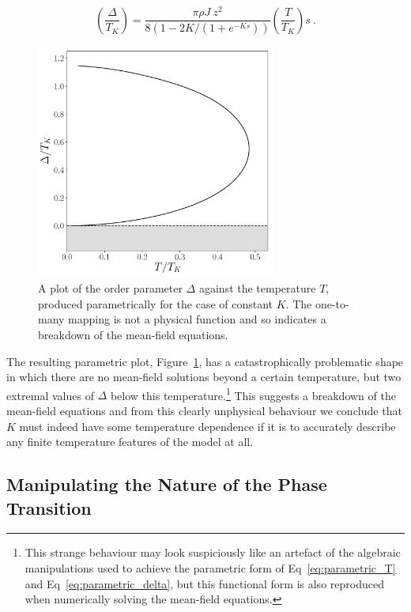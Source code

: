 \begin{equation}
\left( \frac{\Delta}{T_K} \right) = \frac{\pi \rho J ~ z^2}{8 (1 - 2 K / (1 + e^{- K s}))} \left( \frac{T}{T_K} \right) s ~ .
\label{eq:parametric_delta}
\end{equation}

\begin{figure}[ht]
\centering
\includegraphics[width=0.7\textwidth]{Figures/new_delta_vs_T_parametric.pdf}
\caption{A plot of the order parameter $ \Delta $ against the temperature $ T $, produced parametrically for the case of constant $ K $. The one-to-many mapping is not a physical function and so indicates a breakdown of the mean-field equations.}
\label{fig:parametric}
\end{figure}

The resulting parametric plot, Figure~\ref{fig:parametric}, has a catastrophically problematic shape in which there are no mean-field solutions beyond a certain temperature, but two extremal values of $ \Delta $ below this temperature.\footnote{This strange behaviour may look suspiciously like an artefact of the algebraic manipulations used to achieve the parametric form of Eq~\eqref{eq:parametric_T} and Eq~\eqref{eq:parametric_delta}, but this functional form is also reproduced when numerically solving the mean-field equations.} This suggests a breakdown of the mean-field equations and from this clearly unphysical behaviour we conclude that $ K $ must indeed have some temperature dependence if it is to accurately describe any finite temperature features of the model at all.

\subsection{Manipulating the Nature of the Phase Transition}
\label{subsec:manipulating_PT}

